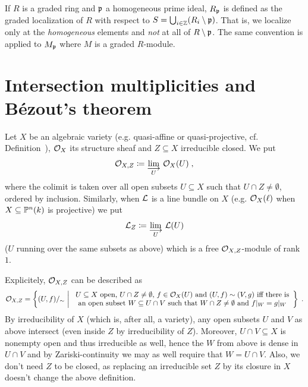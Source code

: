 \documentclass[a4paper,parskip=half,numbers=enddot, DIV=12]{scrreprt}
\begin{document}
\begin{rem}
    If $R$ is a graded ring and $\mathfrak{p}$ a homogeneous prime ideal, $R_{\mathfrak{p}}$ is defined as the graded localization of $R$ with respect to $S=\bigcup_{i\in\mathbb{Z}} (R_i\setminus \mathfrak{p})$. That is, we localize only at the \emph{homogeneous} elements and \emph{not} at all of $R\setminus\mathfrak{p}$. The same convention is applied to $M_{\mathfrak{p}}$ where $M$ is a graded $R$-module.
\end{rem}

\section{Intersection multiplicities and B\'ezout's theorem}


\begin{defi}
    Let $X$ be an algebraic variety (e.g. quasi-affine or quasi-projective, cf. Definition~), $\mathcal{O}_X$ its structure sheaf and $Z\subseteq X$ irreducible closed. We put 
    \begin{align*}
        \Oo_{X,Z}\coloneqq \colimit[U] \Oo_X(U)\;,
    \end{align*}
    where the colimit is taken over all open subsets $U\subseteq X$ such that $U\cap Z\neq\emptyset$, ordered by inclusion. Similarly, when $\mathcal{L}$ is a line bundle on $X$ (e.g. $\mathcal{O}_X(\ell)$ when $X\subseteq \mathbb{P}^n(k)$ is projective) we put
    \begin{align*}
    \Ll_Z\coloneqq\colimit[U] \Ll(U)
    \end{align*}
    ($U$ running over the same subsets as above) which is a free $\mathcal{O}_{X,Z}$-module of rank $1$.
\end{defi}
    
    Explicitely, $\mathcal{O}_{X,Z}$ can be described as
    \begin{align*}
    	\mathcal{O}_{X,Z}=\left\{(U,f)/_\sim\ \middle|\ 
    	\begin{array}{c}
    	U\subseteq X\text{ open, }U\cap Z\neq\emptyset\text{, }f\in\mathcal{O}_X(U)\text{ and }(U,f)\sim (V,g)\text{ iff there is}\\
    	\text{an open subset }W\subseteq U\cap V\text{ such that }W\cap Z\neq\emptyset\text{ and }f|_W=g|_W
    	\end{array}
    	\right\}\;.
    \end{align*}
    By  irreducibility of $X$ (which is, after all, a variety), any open subsets $U$ and $V$ as above intersect (even inside $Z$ by irreducibility of $Z$). Moreover, $U\cap V\subseteq X$ is nonempty open and thus irreducible as well, hence the $W$ from above is dense in $U\cap V$ and by Zariski-continuity we may as well require that $W=U\cap V$. Also, we don't need $Z$ to be closed, as replacing an irreducible set $Z$ by its closure in $X$ doesn't change the above definition.
    
\end{document}
